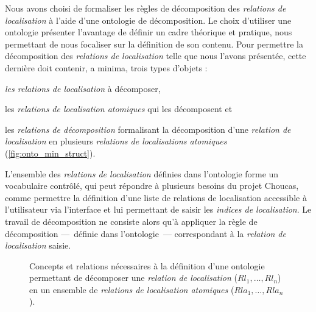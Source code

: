 Nous avons choisi de formaliser les règles de décomposition des
\emph{relations de localisation} à l'aide d'une ontologie de
décomposition. Le choix d'utiliser une ontologie présenter l'avantage
de définir un cadre théorique et pratique, nous permettant de nous
focaliser sur la définition de son contenu. Pour permettre la
décomposition des \emph{relations de localisation} telle que nous
l'avons présentée, cette dernière doit contenir, a minima, trois types
d'objets :
%
\begin{enumerate*}[label=(\alph*)]
\item \emph{les relations de localisation} à décomposer,
\item les \emph{relations de localisation atomiques} qui les
  décomposent et
\item les \emph{relations de décomposition} formalisant la
  décomposition d'une \emph{relation de localisation} en plusieurs
  \emph{relations de localisations atomiques}
  (\autoref{fig:onto_min_struct}).
\end{enumerate*}

L'ensemble des \emph{relations de localisation} définies dans
l'ontologie forme un vocabulaire contrôlé, qui peut répondre à
plusieurs besoins du projet Choucas, comme permettre la définition
d'une liste de relations de localisation accessible à l'utilisateur
via l'interface et lui permettant de saisir les \emph{indices de
  localisation}. Le travail de décomposition ne consiste alors qu'à
appliquer la règle de décomposition ---~définie dans l'ontologie~---
correspondant à la \emph{relation de localisation} saisie.

\begin{figure}
  \centering
   
  \caption[Structure générale d'une ontologie de
  décomposition]{Concepts et relations nécessaires à la définition
    d'une ontologie permettant de décomposer une \emph{relation de
      localisation} ($Rl_1, \ldots, Rl_n$) en un ensemble de
    \emph{relations de localisation atomiques}
    ($Rla_1, \ldots, Rla_n$).}
  \label{fig:onto_min_struct}
\end{figure}

